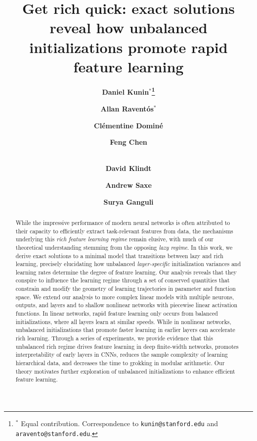 \documentclass{article}
\title{Get rich quick: exact solutions reveal how unbalanced initializations promote rapid feature learning}
\author[1]{\bf Daniel Kunin$^*$\thanks{$^*$ Equal contribution. Correspondence to \texttt{kunin@stanford.edu} and \texttt{aravento@stanford.edu}.}}
\author[1]{\bf Allan Raventós$^*$}
\author[2]{\bf Clémentine Dominé}
\author[1]{\bf Feng Chen}
\author[3]{\\ \bf David Klindt}
\author[2]{\bf Andrew Saxe}
\author[1]{\bf Surya Ganguli}
\affil[1]{Stanford University}
\affil[2]{University College London}
\affil[3]{Cold Spring Harbor Laboratory}
\theoremstyle{plain}
\theoremstyle{definition}
\theoremstyle{remark}
\begin{document}
\maketitle


\begin{abstract}
    \vspace{-10pt}
    While the impressive performance of modern neural networks is often attributed to their capacity to efficiently extract task-relevant features from data, the mechanisms underlying this \emph{rich feature learning regime} remain elusive, with much of our theoretical understanding stemming from the opposing \emph{lazy regime}.
    In this work, we derive exact solutions to a minimal model that transitions between lazy and rich learning, precisely elucidating how unbalanced \emph{layer-specific} initialization variances and learning rates determine the degree of feature learning. %
    Our analysis reveals that they conspire to influence the learning regime through a set of conserved quantities that constrain and modify the geometry of learning trajectories in parameter and function space.
    We extend our analysis to more complex linear models with multiple neurons, outputs, and layers and to shallow nonlinear networks with piecewise linear activation functions.
    In linear networks, rapid feature learning only occurs from balanced initializations, where all layers learn at similar speeds. 
    While in nonlinear networks, unbalanced initializations that promote faster learning in earlier layers can accelerate rich learning.
    Through a series of experiments, we provide evidence that this unbalanced rich regime drives feature learning in deep finite-width networks, promotes interpretability of early layers in CNNs, reduces the sample complexity of learning hierarchical data, and decreases the time to grokking in modular arithmetic. 
    Our theory motivates further exploration of unbalanced initializations to enhance efficient feature learning.%
\end{abstract}


\vspace{-10pt}
\end{document}
